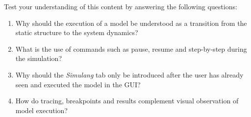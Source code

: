 Test your understanding of this content by answering the following questions:

\begin{enumerate}
\item Why should the execution of a model be understood as a transition from the static structure to the system dynamics?

\item What is the use of commands such as pause, resume and step-by-step during the simulation?

\item Why should the \textit{Simulang} tab only be introduced after the user has already seen and executed the model in the GUI?

\item How do tracing, breakpoints and results complement visual observation of model execution?
\end{enumerate}
